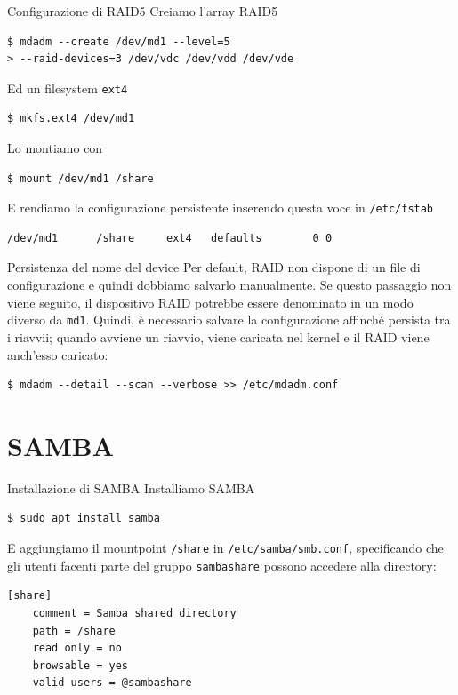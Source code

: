 \documentclass{beamer}
\begin{document}
\begin{frame}[fragile]{Configurazione di RAID5}
Creiamo l'array RAID5
\begin{verbatim}
$ mdadm --create /dev/md1 --level=5 
> --raid-devices=3 /dev/vdc /dev/vdd /dev/vde
\end{verbatim}
Ed un filesystem \texttt{ext4}
\begin{verbatim}
$ mkfs.ext4 /dev/md1
\end{verbatim}
Lo montiamo con
\begin{verbatim}
$ mount /dev/md1 /share
\end{verbatim}
E rendiamo la configurazione persistente inserendo questa voce in \texttt{/etc/fstab}
\begin{verbatim}
/dev/md1      /share     ext4   defaults        0 0
\end{verbatim}
\end{frame}

\begin{frame}[fragile]{Persistenza del nome del device}
Per default, RAID non dispone di un file di configurazione e quindi dobbiamo salvarlo manualmente. Se questo passaggio non viene seguito, il dispositivo RAID potrebbe essere denominato in un modo diverso da \texttt{md1}. Quindi, è necessario salvare la configurazione affinché persista tra i riavvii; quando avviene un riavvio, viene caricata nel kernel e il RAID viene anch'esso caricato:

\begin{verbatim}
$ mdadm --detail --scan --verbose >> /etc/mdadm.conf
\end{verbatim}
\end{frame}

\section{SAMBA}
\begin{frame}[fragile]{Installazione di SAMBA}
Installiamo SAMBA
\begin{verbatim}
$ sudo apt install samba
\end{verbatim}
E aggiungiamo il mountpoint \texttt{/share} in \texttt{/etc/samba/smb.conf}, specificando che gli utenti facenti parte del gruppo \texttt{sambashare} possono accedere alla directory:
\begin{lstlisting}
[share]
    comment = Samba shared directory
    path = /share
    read only = no
    browsable = yes
    valid users = @sambashare
\end{lstlisting}
\end{frame}
\end{document}
